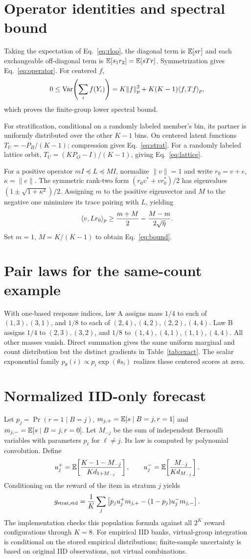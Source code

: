 \section{Operator identities and spectral bound}
Taking the expectation of Eq.~\ref{eq:rloo}, the diagonal term is $\mathbb{E}[sr]$ and
each exchangeable off-diagonal term is $\mathbb{E}[s_1r_2]=\mathbb{E}[sTr]$.
Symmetrization gives Eq.~\ref{eq:operator}. For centered $f$,
\[
0\le\operatorname{Var}\!\left(\sum_i f(Y_i)\right)
=K\|f\|_p^2+K(K-1)\langle f,Tf\rangle_p,
\]
which proves the finite-group lower spectral bound.

For stratification, conditional on a randomly labeled member's bin, its partner
is uniformly distributed over the other $K-1$ bins. On centered latent functions
$T_U=-P_B/(K-1)$; compression gives Eq.~\ref{eq:strat}.
For a randomly labeled lattice orbit,
$T_U=(KP_O-I)/(K-1)$, giving Eq.~\ref{eq:lattice}.

For a positive operator $mI\preceq L\preceq MI$, normalize $\|v\|=1$ and write
$r_0=v+e$, $\kappa=\|e\|$. The symmetric rank-two form
$(r_0v^*+vr_0^*)/2$ has eigenvalues $(1\pm\sqrt{1+\kappa^2})/2$.
Assigning $m$ to the positive eigenvector and $M$ to the negative one minimizes
its trace pairing with $L$, yielding
\[
\langle v,Lr_0\rangle_p\ge\frac{m+M}{2}-\frac{M-m}{2\sqrt\eta}.
\]
Set $m=1$, $M=K/(K-1)$ to obtain Eq.~\ref{eq:bound}.

\section{Pair laws for the same-count example}
With one-based response indices, law A assigns mass $1/4$ to each of $(1,3),(3,1)$,
and $1/8$ to each of $(2,4),(4,2),(2,2),(4,4)$.
Law B assigns $1/4$ to $(2,3),(3,2)$, and $1/8$ to
$(1,4),(4,1),(1,1),(4,4)$. All other masses vanish. Direct summation gives the
same uniform marginal and count distribution but the distinct gradients in
Table~\ref{tab:exact}. The scalar exponential family
$p_\theta(i)\propto p_i\exp(\theta s_i)$ realizes these centered scores at zero.

\section{Normalized IID-only forecast}\label{app:forecast}
Let $p_j=\Pr(r=1\mid B=j)$, $m_{j,+}=\mathbb{E}[s\mid B=j,r=1]$ and
$m_{j,-}=\mathbb{E}[s\mid B=j,r=0]$. Let $M_{-j}$ be the sum of independent Bernoulli
variables with parameters $p_\ell$ for $\ell\ne j$. Its law is computed by polynomial
convolution. Define
\[
u_j^+=\mathbb{E}\!\left[\frac{K-1-M_{-j}}{K d_{1+M_{-j}}}\right],\qquad
u_j^-=\mathbb{E}\!\left[\frac{M_{-j}}{K d_{M_{-j}}}\right].
\]
Conditioning on the reward of the item in stratum $j$ yields
\[
g_{\rm strat,std}=\frac1K\sum_j
\left[p_ju_j^+m_{j,+}-(1-p_j)u_j^-m_{j,-}\right].
\]
The implementation checks this population formula against all $2^K$ reward
configurations through $K=8$. For empirical IID banks, virtual-group integration
is conditional on the stored empirical distributions; finite-sample uncertainty
is based on original IID observations, not virtual combinations.

